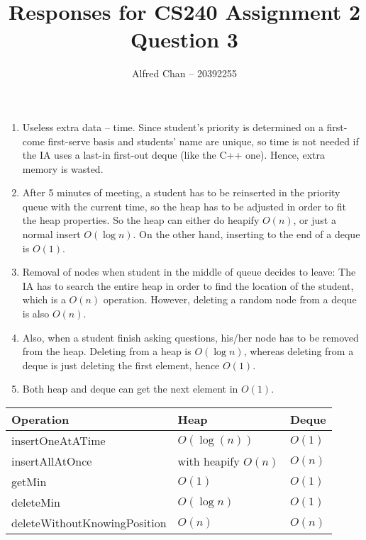\documentclass[12pt]{article}
\title{Responses for CS240 Assignment 2 Question 3}
\author{Alfred Chan -- 20392255}
\begin{document}
\maketitle

\begin{enumerate}
\item Useless extra data -- time.
Since student's priority is determined on a first-come first-serve basis and students' name are unique, so time is not needed if the IA uses a last-in first-out deque (like the C++ one).
Hence, extra memory is wasted.
\item After 5 minutes of meeting, a student has to be reinserted in the priority queue with the current time, so the heap has to be adjusted in order to fit the heap properties.
So the heap can either do heapify $O(n)$, or just a normal insert $O(\log n)$.
On the other hand, inserting to the end of a deque is $O(1)$.
\item Removal of nodes when student in the middle of queue decides to leave:
The IA has to search the entire heap in order to find the location of the student, which is a $O(n)$ operation.
However, deleting a random node from a deque is also $O(n)$.
\item Also, when a student finish asking questions, his/her node has to be removed from the heap.
Deleting from a heap is $O(\log n)$, whereas deleting from a deque is just deleting the first element, hence $O(1)$.
\item Both heap and deque can get the next element in $O(1)$.
\end{enumerate}

\begin{tabular}{| l | l | l |}
  \hline
	Operation & Heap & Deque\\
  \hline
	insertOneAtATime & $O(\log(n))$ & $O(1)$\\
	insertAllAtOnce & with heapify $O(n)$ & $O(n)$\\
	getMin & $O(1)$ & $O(1)$\\
	deleteMin & $O(\log n)$ & $O(1)$\\
	deleteWithoutKnowingPosition & $O(n)$ & $O(n)$\\
  \hline  
\end{tabular}
\end{document}
